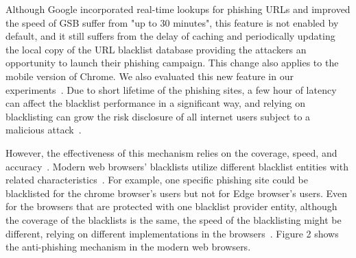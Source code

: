 Although Google incorporated real-time lookups for phishing URLs and improved the speed of GSB suffer from "up to 30 minutes", this feature is not enabled by default, and it still suffers from the delay of caching and periodically updating the local copy of the URL blacklist database providing the attackers an opportunity to launch their phishing campaign. This change also applies to the mobile version of Chrome. We also evaluated this new feature in our experiments~\cite{google-online-security-blog-2019}. Due to short lifetime of the phishing sites, a few hour of latency can affect the blacklist performance in a significant way, and relying on blacklisting can grow the risk disclosure of all internet users subject to a malicious attack~\cite{oest2020sunrise,sheng2009empirical}.




However, the effectiveness of this mechanism relies on the coverage, speed, and accuracy~\cite{sheng2009empirical}. Modern web browsers' blacklists utilize different blacklist entities with related characteristics~\cite{bell2020analysis}. For example, one specific phishing site could be blacklisted for the chrome browser's users but not for Edge browser's users.
Even for the browsers that are protected with one blacklist provider entity, although the coverage of the blacklists is the same, the speed of the blacklisting might be different, relying on different implementations in the browsers~\cite{oest2019phishfarm}.
Figure 2 shows the anti-phishing mechanism in the modern web browsers. 

